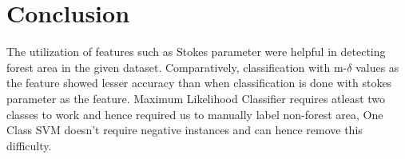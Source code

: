 
\chapter{Conclusion } %

\label{Chapter5} %



The utilization of features such as Stokes parameter were helpful in detecting forest area in the given dataset. Comparatively, classification with m-$\delta$ values as the feature showed lesser accuracy than when classification is done with stokes parameter as the feature. Maximum Likelihood Classifier requires atleast two classes to work and hence required us to manually label non-forest area, One Class SVM doesn't require negative instances and can hence remove this difficulty.
